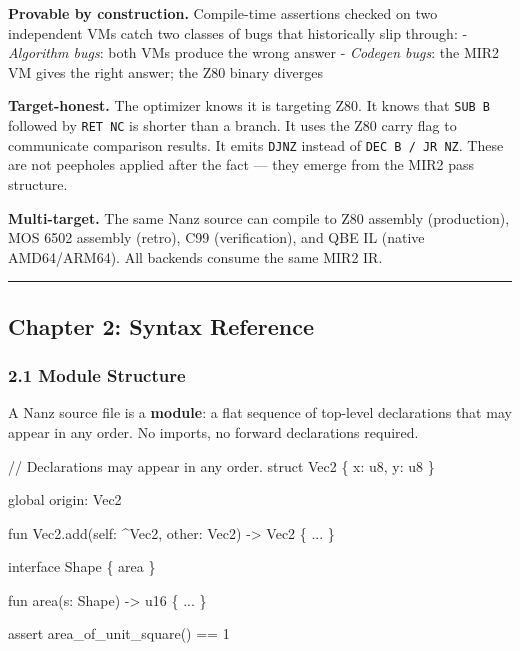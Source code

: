 \documentclass[
  11pt,
  a4paper,
]{report}
\newenvironment{Shaded}{\begin{snugshade}\small}{\end{snugshade}}
\newcommand{\NormalTok}[1]{#1}
\begin{document}
\textbf{Provable by construction.} Compile-time assertions checked on
two independent VMs catch two classes of bugs that historically slip
through: - \emph{Algorithm bugs}: both VMs produce the wrong answer -
\emph{Codegen bugs}: the MIR2 VM gives the right answer; the Z80 binary
diverges

\textbf{Target-honest.} The optimizer knows it is targeting Z80. It
knows that \texttt{SUB\ B} followed by \texttt{RET\ NC} is shorter than
a branch. It uses the Z80 carry flag to communicate comparison results.
It emits \texttt{DJNZ} instead of \texttt{DEC\ B\ /\ JR\ NZ}. These are
not peepholes applied after the fact --- they emerge from the MIR2 pass
structure.

\textbf{Multi-target.} The same Nanz source can compile to Z80 assembly
(production), MOS 6502 assembly (retro), C99 (verification), and QBE IL
(native AMD64/ARM64). All backends consume the same MIR2 IR.

\begin{center}\rule{0.5\linewidth}{0.5pt}\end{center}

\subsection{Chapter 2: Syntax
Reference}\label{chapter-2-syntax-reference}

\subsubsection{2.1 Module Structure}\label{module-structure}

A Nanz source file is a \textbf{module}: a flat sequence of top-level
declarations that may appear in any order. No imports, no forward
declarations required.

\begin{Shaded}
\begin{Highlighting}[]
\NormalTok{// Declarations may appear in any order.}
\NormalTok{struct Vec2 \{ x: u8, y: u8 \}}

\NormalTok{global origin: Vec2}

\NormalTok{fun Vec2.add(self: \^{}Vec2, other: Vec2) {-}\textgreater{} Vec2 \{ ... \}}

\NormalTok{interface Shape \{ area \}}

\NormalTok{fun area(s: Shape) {-}\textgreater{} u16 \{ ... \}}

\NormalTok{assert area\_of\_unit\_square() == 1}
\end{Highlighting}
\end{Shaded}
\end{document}
